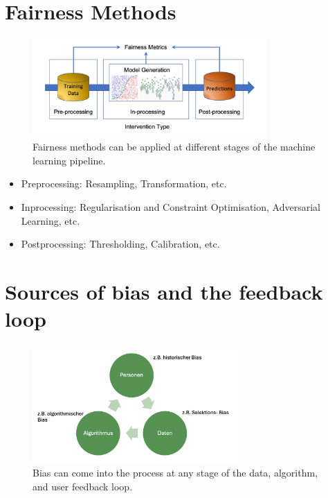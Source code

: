 \documentclass[11pt,a4paper]{article}
\begin{document}
\section{Fairness Methods}
\begin{figure}[h]
    \centering
    \includegraphics[width=0.8\textwidth]{../figures/fairness_methods.png}
    \caption{Fairness methods can be applied at different stages of the machine learning pipeline\parencite{caton2024}.}
\end{figure}
\begin{itemize}
    \item Preprocessing: Resampling, Transformation, etc.
    \item Inprocessing: Regularisation and Constraint Optimisation, Adversarial Learning, etc.
    \item Postprocessing: Thresholding, Calibration, etc.
\end{itemize}

\section{Sources of bias and the feedback loop}
\begin{figure}[h]
    \centering
    \includegraphics[width=0.7\textwidth]{../figures/bias_loop.png}
    \caption{Bias can come into the process at any stage of the data, algorithm, and user feedback loop\parencite{mehrabi2022}.}
\end{figure} 

\renewcommand{\bibfont}{\scriptsize}  %
\printbibliography
\end{document}

